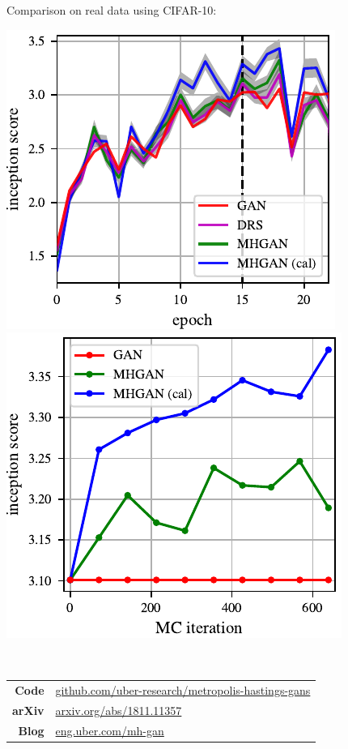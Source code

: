\documentclass[a0,landscape]{a0poster}
\begin{document}
\begin{multicols}{3}
\begin{center}
\end{center}

\columnbreak

Comparison on real data using CIFAR-10:
\begin{center}
\includegraphics[scale=2.5]{../figures/per_epoch.pdf}
\includegraphics[scale=2.5]{../figures/plot_per_mh.pdf}
\end{center}

~\\

\begin{center}
\begin{tabular}{rl}
\textbf{Code} &
\large {\url{github.com/uber-research/metropolis-hastings-gans}} \\
\textbf{arXiv} &
\large {\url{arxiv.org/abs/1811.11357}} \\
\textbf{Blog} &
\large {\url{eng.uber.com/mh-gan}}
\end{tabular}
\end{center}

\end{multicols}
\end{document}
